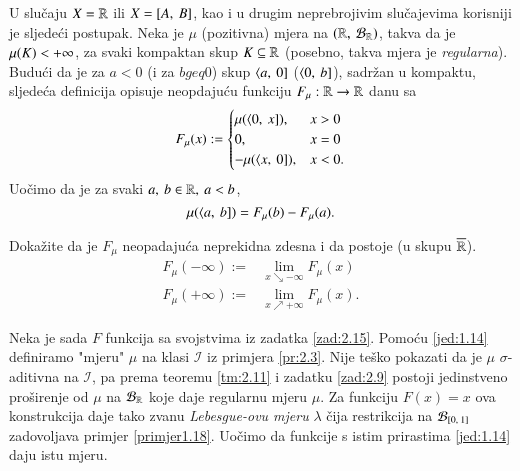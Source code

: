 U slu\v caju $X = \mathbb{R}$ ili $X = [{A}, \:{B}]$, kao i u drugim
neprebrojivim slu\v cajevima korisniji je sljede\' ci postupak.
Neka je $\mu$ (pozitivna) mjera na $(\mathbb{R}, \: \mathcal{B}_{\mathbb{R}})$, takva da je
$\mu({K}) < +\infty$, za svaki kompaktan skup $K \subseteq \mathbb{R}$
(posebno, takva mjera je \emph{regularna}). Budu\' ci da je za
$a < 0$ (i za $b geq 0$) skup $\langle {a}, \: {0}]$ ($\langle {0}, \: {b}]$),
sadr\v zan u kompaktu, sljede\' ca definicija opisuje neopdaju\' cu
funkciju $F_{\mu}: \mathbb{R} \to \mathbb{R}$ danu sa
\begin{equation}    \label{jed:2.13}
    F_{\mu}(x) :=
        \begin{cases}
            \mu({\langle {0}, \: {x}]}), &x > 0\\
            0,   &x = 0\\
            - \mu({\langle {x}, \: {0}]}), &x < 0.
        \end{cases}
\end{equation}
Uo\v cimo da je za svaki $a, \: b \in \mathbb{R}, \: a < b$,
\begin{equation}    \label{jed:1.14}
    \mu({\langle {a}, \: {b}]}) = F_{\mu}(b) - F_{\mu}(a).
\end{equation}

\begin{zad} \label{zad:2.15}
    Doka\v zite da je $F_{\mu}$ neopadaju\' ca neprekidna zdesna i da
    postoje (u skupu $\overline{\mathbb{R}}$).
    \begin{align*}
        F_{\mu}(-\infty) :=& \lim_{x \searrow -\infty} F_{\mu}(x)\\
        F_{\mu}(+\infty) :=& \lim_{x \nearrow +\infty} F_{\mu}(x).
    \end{align*}
\end{zad}

Neka je sada $F$ funkcija sa svojstvima iz zadatka \ref{zad:2.15}.
Pomo\' cu \eqref{jed:1.14} definiramo "mjeru" $\mu$ na klasi
$\mathcal{I}$ iz primjera \eqref{pr:2.3}. Nije te\v sko pokazati
da je $\mu$ $\sigma$-aditivna na $\mathcal{I}$, pa prema teoremu
\ref{tm:2.11} i zadatku \ref{zad:2.9} postoji jedinstveno
pro\v sirenje od $\mu$ na $\mathcal{B}_{\mathbb{R}}$ koje daje regularnu mjeru
$\mu$. Za funkciju $F(x) = x$ ova konstrukcija daje tako zvanu
\emph{Lebesgue-ovu mjeru} $\lambda$ \v cija restrikcija na
$\mathcal{B}_{[{0}, \:{1}]}$ zadovoljava primjer \ref{primjer1.18}.
Uo\v cimo da funkcije s istim prirastima \eqref{jed:1.14}
daju istu mjeru.



